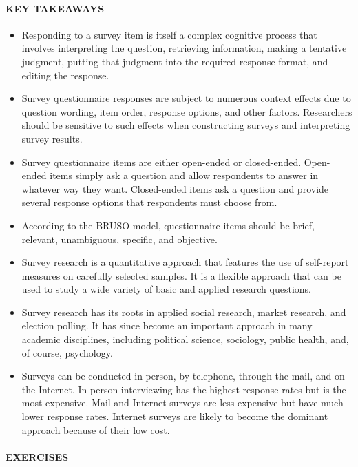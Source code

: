 \documentclass[
]{krantz}
\providecommand{\tightlist}{%
  \setlength{\itemsep}{0pt}\setlength{\parskip}{0pt}}
\begin{document}
\paragraph*{KEY TAKEAWAYS}\label{key-takeaways-21}

\begin{itemize}
\tightlist
\item
  Responding to a survey item is itself a complex cognitive process that involves interpreting the question, retrieving information, making a tentative judgment, putting that judgment into the required response format, and editing the response.
\item
  Survey questionnaire responses are subject to numerous context effects due to question wording, item order, response options, and other factors. Researchers should be sensitive to such effects when constructing surveys and interpreting survey results.
\item
  Survey questionnaire items are either open-ended or closed-ended. Open-ended items simply ask a question and allow respondents to answer in whatever way they want. Closed-ended items ask a question and provide several response options that respondents must choose from.
\item
  According to the BRUSO model, questionnaire items should be brief, relevant, unambiguous, specific, and objective.
\item
  Survey research is a quantitative approach that features the use of self-report measures on carefully selected samples. It is a flexible approach that can be used to study a wide variety of basic and applied research questions.
\item
  Survey research has its roots in applied social research, market research, and election polling. It has since become an important approach in many academic disciplines, including political science, sociology, public health, and, of course, psychology.
\item
  Surveys can be conducted in person, by telephone, through the mail, and on the Internet. In-person interviewing has the highest response rates but is the most expensive. Mail and Internet surveys are less expensive but have much lower response rates. Internet surveys are likely to become the dominant approach because of their low cost.
\end{itemize}

\paragraph*{EXERCISES}\label{exercises-17}
\end{document}
